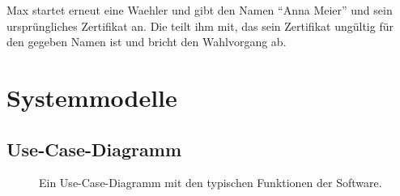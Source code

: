 \documentclass[parskip=full,11pt,twoside]{scrartcl}
\begin{document}
\teststep{}
		{Max startet erneut eine \gls{Waehler}  und gibt den Namen \enquote{Anna Meier} und sein ursprüngliches \gls{Zertifikat} an.}
		{Die  teilt ihm mit, das sein \gls{Zertifikat} ungültig für den gegeben Namen ist und bricht den Wahlvorgang ab.}

\section{Systemmodelle}

\subsection{Use-Case-Diagramm}
\begin{figure}[H]
	\caption{\label{fig:usecase}
		Ein Use-Case-Diagramm mit den typischen Funktionen der Software.
	}
\end{figure}
\end{document}
